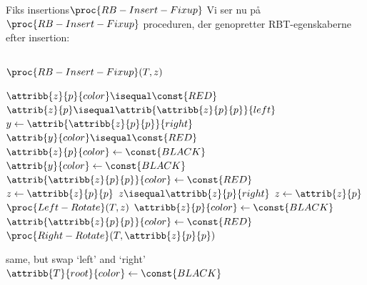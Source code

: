 \documentclass[aspectratio=1610]{beamer}
\begin{document}
\begin{frame}{Fiks insertions}{$\proc{RB-Insert-Fixup}$}
    Vi ser nu på $\proc{RB-Insert-Fixup}$ proceduren, der genopretter
    RBT-egenskaberne efter insertion:

    \begin{columns}
        \begin{block}{$\proc{RB-Insert-Fixup}(T,z)$}
            \footnotesize
        
            \vspace{-2\abovedisplayskip}
            \begin{codebox}
                \li \While $\attribb{z}{p}{color} \isequal \const{RED}$
                    \Do
                \li     \If $\attrib{z}{p} \isequal
                            \attrib{\attribb{z}{p}{p}}{left}$
                        \Then
                \li         $y \gets
                                \attrib{\attribb{z}{p}{p}}{right}$ 
                \li         \If $\attrib{y}{color} \isequal \const{RED}$ 
                            \Then
                \li             $\attribb{z}{p}{color} \gets \const{BLACK}$ 
                \li             $\attrib{y}{color} \gets \const{BLACK}$ 
                \li             $\attrib{\attribb{z}{p}{p}}{color} \gets \const{RED}$ 
                \li             $z \gets \attribb{z}{p}{p}$
                \li         \Else
                \li             \If $z \isequal
                                    \attribb{z}{p}{right}$ 
                                \Then
                \li                 $z \gets \attrib{z}{p}$
                \li                 $\proc{Left-Rotate}(T,z)$
                                \End
                \li             $\attribb{z}{p}{color} \gets
                                    \const{BLACK}$ 
                \li             $\attrib{\attribb{z}{p}{p}}{color}
                                    \gets \const{RED}$
                \li             $\proc{Right-Rotate}(T,
                                    \attribb{z}{p}{p})$
                            \End

                \li     \Else same, but swap `left' and `right'
                        \End
                    \End
                \li $\attribb{T}{root}{color} \gets \const{BLACK}$ 

            \end{codebox}
        \end{block}
    

\end{columns}
\end{frame}
\end{document}
